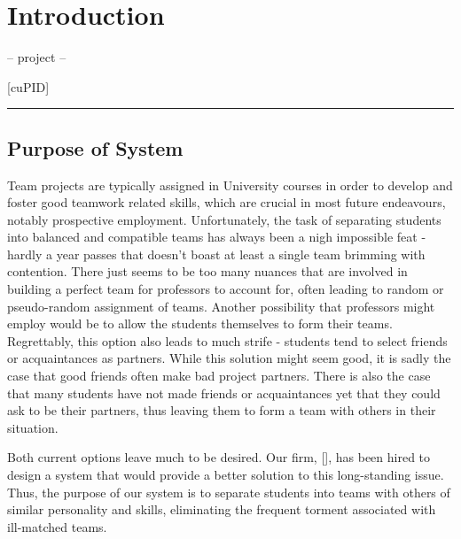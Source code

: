 \documentclass[12pt,letterpaper]{article}
\begin{document}
\renewcommand{\listfigurename}{Figures}
\listoffigures

\renewcommand{\listtablename}{Tables}
\listoftables

\newpage{}

\section{Introduction}

\begin{center}
    -- project --
\end{center}

\begin{center}
	\Huge [cuPID]
\end{center}

\begin{center}
    \rule{0.85\textwidth}{0.5pt}
\end{center}

\subsection{Purpose of System}

Team projects are typically assigned in University courses in order to develop and foster
good teamwork related skills, which are crucial in most future endeavours, notably 
prospective employment. Unfortunately, the task of separating students into balanced 
and compatible teams has always been a nigh impossible feat - hardly a year passes that doesn't
boast at least a single team brimming with  contention. There just seems to be too many
nuances that are involved in building a perfect team for professors to account for, often leading
to random or pseudo-random assignment of teams. Another possibility that professors might employ
would be to allow the students themselves to form their teams. Regrettably, this option also
leads to much strife - students tend to select friends or acquaintances as partners. While this
solution might seem good, it is sadly the case that good friends often make bad project partners. 
There is also the case that many students have not made friends or acquaintances yet that they 
could ask to be their partners, thus leaving them to form a team with others in their situation.

Both current options leave much to be desired. Our firm, [\teamname{}], has been hired
to design a system that would provide a better solution to this long-standing issue. Thus, the purpose of
our system is to separate students into teams with others of similar personality and skills, eliminating 
the frequent torment associated with ill-matched teams.
\end{document}
